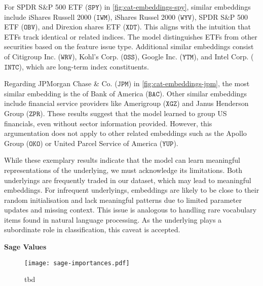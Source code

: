 For SPDR S\&P 500 ETF ($\mathtt{SPY}$) in \cref{fig:cat-embeddings-spy}, similar embeddings include iShares Russell 2000 ($\mathtt{IWM}$), iShares Russel 2000 ($\mathtt{WYV}$), SPDR S\&P 500 ETF ($\mathtt{OBV}$), and Direxion shares ETF ($\mathtt{XDT}$). This aligns with the intuition that \glspl{ETF} track identical or related indices. The model distinguishes \glspl{ETF} from other securities based on the feature issue type. Additional similar embeddings consist of Citigroup Inc. ($\mathtt{WRV}$), Kohl's Corp. ($\mathtt{OSS}$), Google Inc. ($\mathtt{YTM}$), and Intel Corp. ($\mathtt{INTC}$), which are long-term index constituents.

Regarding JPMorgan Chase \& Co. ($\mathtt{JPM}$) in \cref{fig:cat-embeddings-jpm}, the most similar embedding is the of Bank of America ($\mathtt{BAC}$). Other similar embeddings include financial service providers like Amerigroup ($\mathtt{XGZ}$) and Janus Henderson Group ($\mathtt{ZPR}$). These results suggest that the model learned to group US financials, even without sector information provided. However, this argumentation does not apply to other related embeddings such as the Apollo Group ($\mathtt{OKO}$) or United Parcel Service of America ($\mathtt{YUP}$). %

While these exemplary results indicate that the model can learn meaningful representations of the underlying, we must acknowledge its limitations. Both underlyings are frequently traded in our dataset, which may lead to meaningful embeddings. For infrequent underlyings, embeddings are likely to be close to their random initialisation and lack meaningful patterns due to limited parameter updates and missing context. This issue is analogous to handling rare vocabulary items found in natural language processing. As the underlying plays a subordinate role in classification, this caveat is accepted.

\textbf{Sage Values}

\begin{figure}[h!]
    \centering
    \texttt{[image: sage-importances.pdf]}
    \caption[tbd]{tbd}
    \label{fig:sage-importances}
\end{figure}


